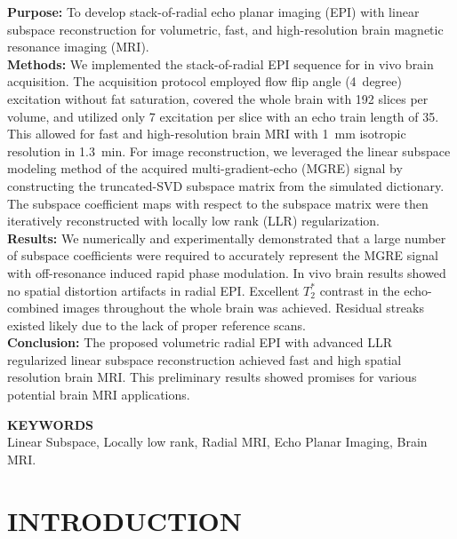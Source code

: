 \documentclass[a4paper,11pt]{article}
\begin{document}
\pagebreak


\doublespacing

\noindent
\textbf{Purpose:} To develop stack-of-radial echo planar imaging (EPI)
with linear subspace reconstruction for volumetric, fast, and high-resolution
brain magnetic resonance imaging (MRI).\\
\textbf{Methods:} We implemented the stack-of-radial EPI
sequence for in vivo brain acquisition.
The acquisition protocol employed flow flip angle (4~degree) excitation
without fat saturation,
covered the whole brain with 192 slices per volume,
and utilized only 7 excitation per slice
with an echo train length of 35.
This allowed for fast and high-resolution brain MRI
with \SI{1}{\mm} isotropic resolution in \SI{1.3}{\minute}.
For image reconstruction,
we leveraged the linear subspace modeling method
of the acquired multi-gradient-echo (MGRE) signal
by constructing the truncated-SVD subspace matrix from the simulated dictionary.
The subspace coefficient maps with respect to the subspace matrix were then
iteratively reconstructed with locally low rank (LLR) regularization. \\
\textbf{Results:} We numerically and experimentally demonstrated that
a large number of subspace coefficients were required to accurately
represent the MGRE signal with off-resonance induced rapid phase modulation.
In vivo brain results showed no spatial distortion artifacts in radial EPI.
Excellent $T_2^*$ contrast in the echo-combined images
throughout the whole brain was achieved.
Residual streaks existed likely due to the lack of proper reference scans.\\
\textbf{Conclusion:} The proposed volumetric radial EPI
with advanced LLR regularized linear subspace reconstruction
achieved fast and high spatial resolution brain MRI.
This preliminary results showed promises for
various potential brain MRI applications.

\vspace*{3.0\baselineskip}
\noindent
\textbf{KEYWORDS} \\
Linear Subspace,
Locally low rank,
Radial MRI,
Echo Planar Imaging,
Brain MRI.

\vfill
\pagebreak


\section{INTRODUCTION}
\end{document}
